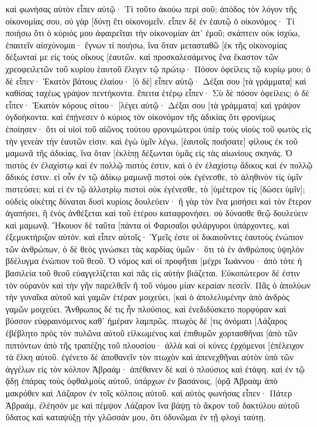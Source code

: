 καὶ φωνήσας αὐτὸν εἶπεν αὐτῷ· Τί τοῦτο ἀκούω περὶ σοῦ; ἀπόδος τὸν λόγον τῆς οἰκονομίας σου, οὐ γὰρ [δύνῃ ἔτι οἰκονομεῖν. 
εἶπεν δὲ ἐν ἑαυτῷ ὁ οἰκονόμος· Τί ποιήσω ὅτι ὁ κύριός μου ἀφαιρεῖται τὴν οἰκονομίαν ἀπ᾽ ἐμοῦ; σκάπτειν οὐκ ἰσχύω, ἐπαιτεῖν αἰσχύνομαι· 
ἔγνων τί ποιήσω, ἵνα ὅταν μετασταθῶ [ἐκ τῆς οἰκονομίας δέξωνταί με εἰς τοὺς οἴκους [ἑαυτῶν. 
καὶ προσκαλεσάμενος ἕνα ἕκαστον τῶν χρεοφειλετῶν τοῦ κυρίου ἑαυτοῦ ἔλεγεν τῷ πρώτῳ· Πόσον ὀφείλεις τῷ κυρίῳ μου; 
ὁ δὲ εἶπεν· Ἑκατὸν βάτους ἐλαίου· [ὁ δὲ] εἶπεν αὐτῷ· Δέξαι σου [τὰ γράμματα] καὶ καθίσας ταχέως γράψον πεντήκοντα. 
ἔπειτα ἑτέρῳ εἶπεν· Σὺ δὲ πόσον ὀφείλεις; ὁ δὲ εἶπεν· Ἑκατὸν κόρους σίτου· [λέγει αὐτῷ· Δέξαι σου [τὰ γράμματα] καὶ γράψον ὀγδοήκοντα. 
καὶ ἐπῄνεσεν ὁ κύριος τὸν οἰκονόμον τῆς ἀδικίας ὅτι φρονίμως ἐποίησεν· ὅτι οἱ υἱοὶ τοῦ αἰῶνος τούτου φρονιμώτεροι ὑπὲρ τοὺς υἱοὺς τοῦ φωτὸς εἰς τὴν γενεὰν τὴν ἑαυτῶν εἰσιν. 
καὶ ἐγὼ ὑμῖν λέγω, [ἑαυτοῖς ποιήσατε] φίλους ἐκ τοῦ μαμωνᾶ τῆς ἀδικίας, ἵνα ὅταν [ἐκλίπῃ δέξωνται ὑμᾶς εἰς τὰς αἰωνίους σκηνάς. 
Ὁ πιστὸς ἐν ἐλαχίστῳ καὶ ἐν πολλῷ πιστός ἐστιν, καὶ ὁ ἐν ἐλαχίστῳ ἄδικος καὶ ἐν πολλῷ ἄδικός ἐστιν. 
εἰ οὖν ἐν τῷ ἀδίκῳ μαμωνᾷ πιστοὶ οὐκ ἐγένεσθε, τὸ ἀληθινὸν τίς ὑμῖν πιστεύσει; 
καὶ εἰ ἐν τῷ ἀλλοτρίῳ πιστοὶ οὐκ ἐγένεσθε, τὸ [ὑμέτερον τίς [δώσει ὑμῖν]; 
οὐδεὶς οἰκέτης δύναται δυσὶ κυρίοις δουλεύειν· ἢ γὰρ τὸν ἕνα μισήσει καὶ τὸν ἕτερον ἀγαπήσει, ἢ ἑνὸς ἀνθέξεται καὶ τοῦ ἑτέρου καταφρονήσει. οὐ δύνασθε θεῷ δουλεύειν καὶ μαμωνᾷ. 
Ἤκουον δὲ ταῦτα [πάντα οἱ Φαρισαῖοι φιλάργυροι ὑπάρχοντες, καὶ ἐξεμυκτήριζον αὐτόν. 
καὶ εἶπεν αὐτοῖς· Ὑμεῖς ἐστε οἱ δικαιοῦντες ἑαυτοὺς ἐνώπιον τῶν ἀνθρώπων, ὁ δὲ θεὸς γινώσκει τὰς καρδίας ὑμῶν· ὅτι τὸ ἐν ἀνθρώποις ὑψηλὸν βδέλυγμα ἐνώπιον τοῦ θεοῦ. 
Ὁ νόμος καὶ οἱ προφῆται [μέχρι Ἰωάννου· ἀπὸ τότε ἡ βασιλεία τοῦ θεοῦ εὐαγγελίζεται καὶ πᾶς εἰς αὐτὴν βιάζεται. 
Εὐκοπώτερον δέ ἐστιν τὸν οὐρανὸν καὶ τὴν γῆν παρελθεῖν ἢ τοῦ νόμου μίαν κεραίαν πεσεῖν. 
Πᾶς ὁ ἀπολύων τὴν γυναῖκα αὐτοῦ καὶ γαμῶν ἑτέραν μοιχεύει, [καὶ ὁ ἀπολελυμένην ἀπὸ ἀνδρὸς γαμῶν μοιχεύει. 
Ἄνθρωπος δέ τις ἦν πλούσιος, καὶ ἐνεδιδύσκετο πορφύραν καὶ βύσσον εὐφραινόμενος καθ᾽ ἡμέραν λαμπρῶς. 
πτωχὸς δέ [τις ὀνόματι [Λάζαρος ἐβέβλητο πρὸς τὸν πυλῶνα αὐτοῦ εἱλκωμένος 
καὶ ἐπιθυμῶν χορτασθῆναι [ἀπὸ τῶν πιπτόντων ἀπὸ τῆς τραπέζης τοῦ πλουσίου· ἀλλὰ καὶ οἱ κύνες ἐρχόμενοι [ἐπέλειχον τὰ ἕλκη αὐτοῦ. 
ἐγένετο δὲ ἀποθανεῖν τὸν πτωχὸν καὶ ἀπενεχθῆναι αὐτὸν ὑπὸ τῶν ἀγγέλων εἰς τὸν κόλπον Ἀβραάμ· ἀπέθανεν δὲ καὶ ὁ πλούσιος καὶ ἐτάφη. 
καὶ ἐν τῷ ᾅδῃ ἐπάρας τοὺς ὀφθαλμοὺς αὐτοῦ, ὑπάρχων ἐν βασάνοις, [ὁρᾷ Ἀβραὰμ ἀπὸ μακρόθεν καὶ Λάζαρον ἐν τοῖς κόλποις αὐτοῦ. 
καὶ αὐτὸς φωνήσας εἶπεν· Πάτερ Ἀβραάμ, ἐλέησόν με καὶ πέμψον Λάζαρον ἵνα βάψῃ τὸ ἄκρον τοῦ δακτύλου αὐτοῦ ὕδατος καὶ καταψύξῃ τὴν γλῶσσάν μου, ὅτι ὀδυνῶμαι ἐν τῇ φλογὶ ταύτῃ. 
